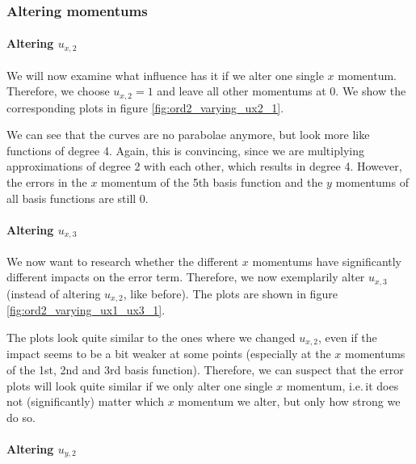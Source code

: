 \documentclass[a4paper, twoside]{article}
\begin{document}
\clearpage{}

\subsubsection{Altering momentums}
\label{sec:stiffness-analysis-ord2-altering-momentums}

\paragraph{\texorpdfstring{Altering $u_{x,2}$}{Altering ux2}}

We will now examine what influence has it if we alter one single $x$ momentum. Therefore, we choose $u_{x,2}=1$ and leave all other momentums at 0. We show the corresponding plots in figure \ref{fig:ord2_varying_ux2_1}.



We can see that the curves are no parabolae anymore, but look more like functions of degree 4. Again, this is convincing, since we are multiplying approximations of degree 2 with each other, which results in degree 4. However, the errors in the $x$ momentum of the 5th basis function and the $y$ momentums of all basis functions are still 0.

\paragraph{\texorpdfstring{Altering $u_{x,3}$}{Altering ux3}}

We now want to research whether the different $x$ momentums have significantly different impacts on the error term. Therefore, we now exemplarily alter $u_{x,3}$ (instead of altering $u_{x,2}$, like before). The plots are shown in figure \ref{fig:ord2_varying_ux1_ux3_1}.



The plots look quite similar to the ones where we changed $u_{x,2}$, even if the impact seems to be a bit weaker at some points (especially at the $x$ momentums of the 1st, 2nd and 3rd basis function). Therefore, we can suspect that the error plots will look quite similar if we only alter one single $x$ momentum, i.e.\,it does not (significantly) matter which $x$ momentum we alter, but only how strong we do so.

\paragraph{\texorpdfstring{Altering $u_{y,2}$}{Altering uy2}}
\end{document}

